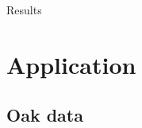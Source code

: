 \documentclass{beamer}
\begin{document}
\begin{frame}{Results}
	
\end{frame}


\section{Application}
\subsection{Oak data}

\end{document}
